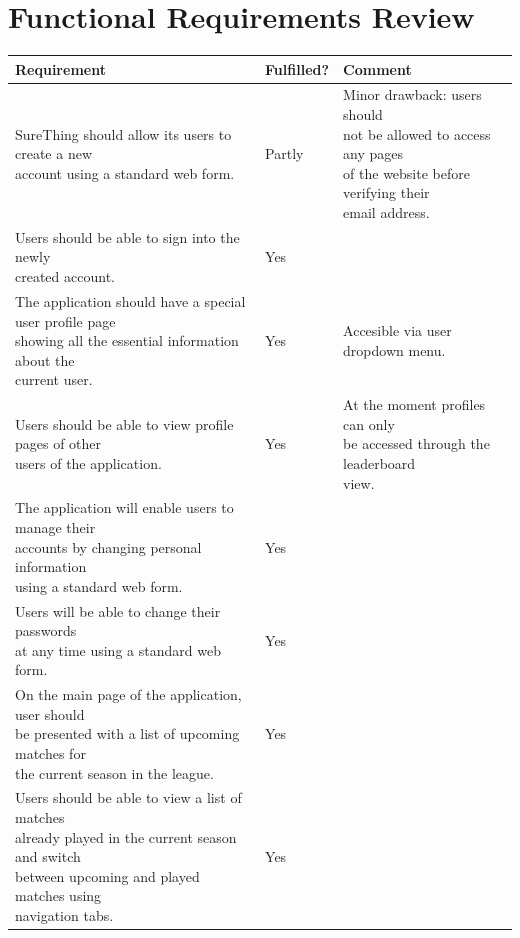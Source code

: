 \chapter{Functional Requirements Review}
\label{ch:requirementsreview_appendix}

\noindent
\begin{tabular}{@{}lll@{}}
	  \hline
        Requirement & Fulfilled? & Comment \\
       \hline 
		\specialcell[t]{SureThing should allow its users to create a new \\ account using a standard web form.} & Partly  & \specialcell[t]{Minor drawback: users should \\ not be allowed to access any pages \\ of the website before verifying their\\ email address. } \\ %
		\specialcell[t]{Users should be able to sign into the newly \\ created account. } &  Yes &  \\ 
		\specialcell[t]{The application should have a special user profile page \\ showing all the essential information about the \\ current user.} &  Yes & Accesible via user dropdown menu. \\ 
		\specialcell[t]{Users should be able to view profile pages of other \\ users of the application.} &  Yes &  \specialcell[t]{At the moment profiles can only \\ be accessed through the leaderboard \\ view.} \\ 
		\specialcell[t]{The application will enable users to manage their\\ accounts by changing personal information\\ using a standard web form.} &  Yes &  \\ 
		\specialcell[t]{	Users will be able to change their passwords \\ at any time using a standard web form.} &  Yes &  \\ 		
		\specialcell[t]{On the main page of the application, user should \\ be presented with a list of upcoming matches for \\the current season in the league.} &  Yes &  \\ 
		 \specialcell[t]{Users should be able to view a list of matches \\ already played in the current season and switch \\ between upcoming and played matches using \\ navigation tabs.} &  Yes &  \\
 \bottomrule
\end{tabular}


